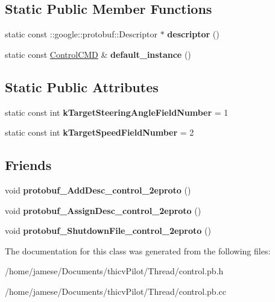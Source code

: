 \subsection*{Static Public Member Functions}
\begin{DoxyCompactItemize}
\item 
\mbox{\label{classcontrol_data_1_1_control_c_m_d_aa93b3e8186ddb882cf5f4bdd9669e573}} 
static const \+::google\+::protobuf\+::\+Descriptor $\ast$ {\bfseries descriptor} ()
\item 
\mbox{\label{classcontrol_data_1_1_control_c_m_d_ada3565d356283957026624f574a582f0}} 
static const \hyperlink{classcontrol_data_1_1_control_c_m_d}{Control\+C\+MD} \& {\bfseries default\+\_\+instance} ()
\end{DoxyCompactItemize}
\subsection*{Static Public Attributes}
\begin{DoxyCompactItemize}
\item 
\mbox{\label{classcontrol_data_1_1_control_c_m_d_a517832ffabf3052b26ffe7b7e18ddcc5}} 
static const int {\bfseries k\+Target\+Steering\+Angle\+Field\+Number} = 1
\item 
\mbox{\label{classcontrol_data_1_1_control_c_m_d_a3fa4d23525f2c7f8f888b0481686c4ec}} 
static const int {\bfseries k\+Target\+Speed\+Field\+Number} = 2
\end{DoxyCompactItemize}
\subsection*{Friends}
\begin{DoxyCompactItemize}
\item 
\mbox{\label{classcontrol_data_1_1_control_c_m_d_a2e43e51b04b1da757a9f8acc45346750}} 
void {\bfseries protobuf\+\_\+\+Add\+Desc\+\_\+control\+\_\+2eproto} ()
\item 
\mbox{\label{classcontrol_data_1_1_control_c_m_d_a98e2a012464850548adb13dee97f8700}} 
void {\bfseries protobuf\+\_\+\+Assign\+Desc\+\_\+control\+\_\+2eproto} ()
\item 
\mbox{\label{classcontrol_data_1_1_control_c_m_d_af994acf04afb92681856576d262aff7f}} 
void {\bfseries protobuf\+\_\+\+Shutdown\+File\+\_\+control\+\_\+2eproto} ()
\end{DoxyCompactItemize}


The documentation for this class was generated from the following files\+:\begin{DoxyCompactItemize}
\item 
/home/jamese/\+Documents/thicv\+Pilot/\+Thread/control.\+pb.\+h\item 
/home/jamese/\+Documents/thicv\+Pilot/\+Thread/control.\+pb.\+cc\end{DoxyCompactItemize}
